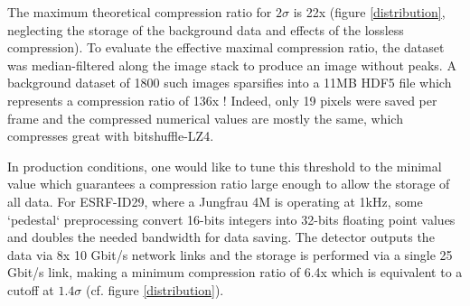 \documentclass[preprint]{iucr}              %
\begin{document}
The maximum theoretical compression ratio for $2\sigma$ is 22x (figure \ref{distribution}, neglecting the storage of the background data and effects of the lossless compression).
To evaluate the effective maximal compression ratio, the dataset was median-filtered along the image stack
to produce an image without peaks. 
A background dataset of 1800 such images sparsifies into a 11MB HDF5 file which represents a compression ratio of 136x ! 
Indeed, only 19 pixels were saved per frame and the compressed numerical values are mostly the same, which compresses great with bitshuffle-LZ4.

In production conditions, one would like to tune this threshold to the minimal value which guarantees a compression ratio large enough to allow the storage of all data.
For ESRF-ID29, where a Jungfrau 4M is operating at 1kHz, some `pedestal` preprocessing convert 16-bits integers into 32-bits floating point values and doubles the needed bandwidth for data saving. 
The detector outputs the data via 8x 10 Gbit/s network links and the storage is performed via  a single  25 Gbit/s link, making a minimum compression ratio of 6.4x which is equivalent to a cutoff at $1.4\sigma$ (cf. figure \ref{distribution}).
\end{document}
